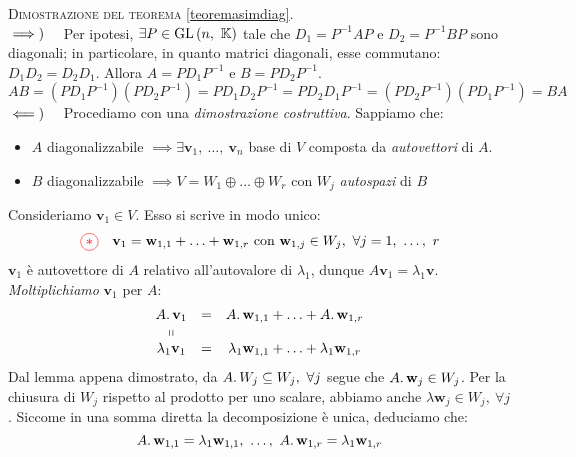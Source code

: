 \begin{demonstration} \textsc{Dimostrazione del teorema} \ref{teoremasimdiag}.\\
	$\implies)\quad$ Per ipotesi, $\exists P\in \operatorname{GL}\left(n,\ \mathbb{K}\right)$ tale che $D_1=P^{-1}AP$ e $D_2=P^{-1}BP$ sono diagonali; in particolare, in quanto matrici diagonali, esse commutano: $D_1D_2=D_2D_1$. Allora $A=PD_1P^{-1}$ e $B=PD_2P^{-1}$.
	\begin{equation*}
		AB=\left(PD_1P^{-1}\right)\left(PD_2P^{-1}\right)=PD_1D_2P^{-1}=PD_2D_1P^{-1}=\left(PD_2P^{-1}\right)\left(PD_1P^{-1}\right)=BA
	\end{equation*}
$\impliedby)\quad$ Procediamo con una \textit{dimostrazione costruttiva}. Sappiamo che:
\begin{itemize}
	\item $A$ diagonalizzabile $\implies \exists \mathbf{v}_1,\ \ldots,\ \mathbf{v}_n$ base di $V$ composta da \textit{autovettori} di $A$.
	\item $B$ diagonalizzabile $\implies V=W_1\oplus\ldots\oplus W_r$ con $W_j$ \textit{autospazi} di $B$
\end{itemize}
Consideriamo $\mathbf{v}_1\in V$. Esso si scrive in modo unico:
\begin{equation*}
	\textcolor{red}{\circled{{\ast}}}\quad \mathbf{v}_1=\mathbf{w}_{1,1}+\ldots+\mathbf{w}_{1,r}\text{ con }\mathbf{w}_{1,j}\in W_j,\ \forall j=1,\ \ldots,\ r
\end{equation*}
$\mathbf{v}_1$ è autovettore di $A$ relativo all'autovalore di $\lambda_1$, dunque $A\mathbf{v}_1=\lambda_1\mathbf{v}$. \textit{Moltiplichiamo} $\mathbf{v}_1$ per $A$:
\begin{equation*}
	\begin{array}{ccc}
		A\ldotp\mathbf{v}_1&=&A\ldotp\mathbf{w}_{1,1}+\ldots+A\ldotp\mathbf{w}_{1,r}\\
		\shortparallel&\\
		\lambda_1\mathbf{v}_1&=&\lambda_1\mathbf{w}_{1,1}+\ldots+\lambda_1\mathbf{w}_{1,r}
	\end{array}
\end{equation*}
Dal lemma appena dimostrato, da $A\ldotp W_j\subseteq W_j,\ \forall j$ segue che $A\ldotp \mathbf{w}_j\in W_j$. Per la chiusura di $W_j$ rispetto al prodotto per uno scalare, abbiamo anche $\lambda \mathbf{w}_j\in W_j,\ \forall j$. Siccome in una somma diretta la decomposizione è unica, deduciamo che:
\begin{equation*}
	A\ldotp \mathbf{w}_{1,1}=\lambda_1 \mathbf{w}_{1,1},\ \ldots,\ A\ldotp \mathbf{w}_{1,r}=\lambda_1 \mathbf{w}_{1,r}

\end{equation*}
\end{demonstration}
